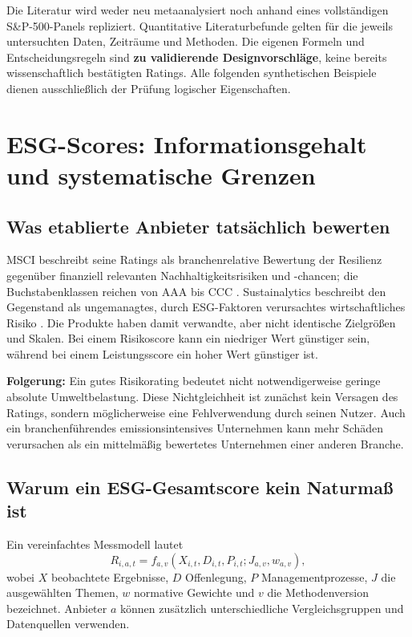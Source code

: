 \documentclass[11pt,a4paper]{article}
\begin{document}
Die Literatur wird weder neu metaanalysiert noch anhand eines vollständigen S\&P-500-Panels repliziert. Quantitative Literaturbefunde gelten für die jeweils untersuchten Daten, Zeiträume und Methoden. Die eigenen Formeln und Entscheidungsregeln sind \textbf{zu validierende Designvorschläge}, keine bereits wissenschaftlich bestätigten Ratings. Alle folgenden synthetischen Beispiele dienen ausschließlich der Prüfung logischer Eigenschaften.

\section{ESG-Scores: Informationsgehalt und systematische Grenzen}
\label{sec:esg}
\subsection{Was etablierte Anbieter tatsächlich bewerten}
MSCI beschreibt seine Ratings als branchenrelative Bewertung der Resilienz gegenüber finanziell relevanten Nachhaltigkeitsrisiken und -chancen; die Buchstabenklassen reichen von AAA bis CCC \cite{msci}. Sustainalytics beschreibt den Gegenstand als ungemanagtes, durch ESG-Faktoren verursachtes wirtschaftliches Risiko \cite{sustainalytics}. Die Produkte haben damit verwandte, aber nicht identische Zielgrößen und Skalen. Bei einem Risikoscore kann ein niedriger Wert günstiger sein, während bei einem Leistungsscore ein hoher Wert günstiger ist.

\textbf{Folgerung:} Ein gutes Risikorating bedeutet nicht notwendigerweise geringe absolute Umweltbelastung. Diese Nichtgleichheit ist zunächst kein Versagen des Ratings, sondern möglicherweise eine Fehlverwendung durch seinen Nutzer. Auch ein branchenführendes emissionsintensives Unternehmen kann mehr Schäden verursachen als ein mittelmäßig bewertetes Unternehmen einer anderen Branche.

\subsection{Warum ein ESG-Gesamtscore kein Naturmaß ist}
Ein vereinfachtes Messmodell lautet
\begin{equation}
R_{i,a,t}=f_{a,v}\!\left(X_{i,t},D_{i,t},P_{i,t};J_{a,v},w_{a,v}\right),
\end{equation}
wobei $X$ beobachtete Ergebnisse, $D$ Offenlegung, $P$ Managementprozesse, $J$ die ausgewählten Themen, $w$ normative Gewichte und $v$ die Methodenversion bezeichnet. Anbieter $a$ können zusätzlich unterschiedliche Vergleichsgruppen und Datenquellen verwenden.
\end{document}
